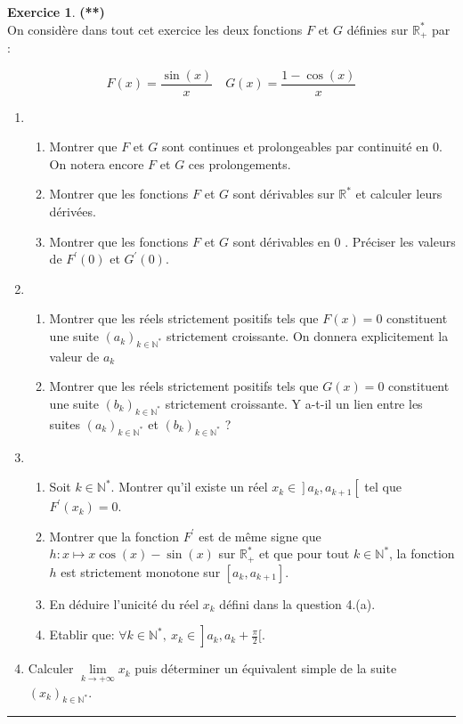\documentclass[a4paper,11pt]{article}
\theoremstyle{definition}
\newtheorem{exo}{Exercice} %
\begin{document}
\begin{exo}\textbf{(**)}\quad\\[0.25cm]
		On considère dans tout cet exercice les deux fonctions $F$ et $G$ définies sur $\mathbb{R}_{+}^{*}$ par :
	
	$$
	F(x)=\frac{\sin (x)}{x} \quad G(x)=\frac{1-\cos (x)}{x}
	$$
	\begin{enumerate}
		\item \begin{enumerate}
			\item Montrer que $F$ et $G$ sont continues et prolongeables par continuité en 0. On notera encore $F$ et $G$ ces prolongements.
			\item Montrer que les fonctions $F$ et $G$ sont dérivables sur $\mathbb{R}^{*}$ et calculer leurs dérivées.
			\item Montrer que les fonctions $F$ et $G$ sont dérivables en 0 . Préciser les valeurs de $F^{\prime}(0)$ et $G^{\prime}(0)$.
		\end{enumerate}
		\item \begin{enumerate}
			\item  Montrer que les réels strictement positifs tels que $F(x)=0$ constituent une suite $\left(a_{k}\right)_{k \in \mathbb{N}^{*}}$ strictement croissante. On donnera explicitement la valeur de $a_{k}$
			\item Montrer que les réels strictement positifs tels que $G(x)=0$ constituent une suite $\left(b_{k}\right)_{k \in \mathbb{N}^{*}}$ strictement croissante. Y a-t-il un lien entre les suites $\left(a_{k}\right)_{k \in \mathbb{N}^{*}}$ et $\left(b_{k}\right)_{k \in \mathbb{N}^{*}}$ ?
		\end{enumerate}
	\item \begin{enumerate}
		\item Soit $k \in \mathbb{N}^{*}$. Montrer qu'il existe un réel $\left.x_{k} \in\right] a_{k}, a_{k+1}\left[\right.$ tel que $F^{\prime}\left(x_{k}\right)=0$.
		\item Montrer que la fonction $F^{\prime}$ est de même signe que $h: x \longmapsto x \cos (x)-\sin (x)$ sur $\mathbb{R}_{+}^{*}$ et que pour tout $k \in \mathbb{N}^{*}$, la fonction $h$ est strictement monotone sur $\left[a_{k}, a_{k+1}\right]$.
		\item En déduire l'unicité du réel $x_{k}$ défini dans la question 4.(a).
		\item Etablir que: $\left.\forall k \in \mathbb{N}^{*}, \ x_{k} \in\right] a_{k}, a_{k}+\frac{\pi}{2}[$.
	\end{enumerate}
	\item Calculer $\lim\limits_{k \rightarrow+\infty} x_{k}$ puis déterminer un équivalent simple de la suite $\left(x_{k}\right)_{k \in \mathbb{N}^{*}}$.
	\end{enumerate}


	\centering
\rule{1\linewidth}{0.6pt}
\end{exo}
	
\end{document}
